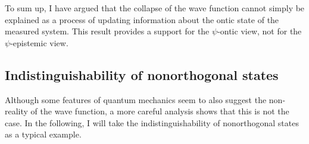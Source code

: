 To sum up, I have argued that the collapse of the wave function cannot simply be explained as a process of updating information about the ontic state of the measured system. This result provides a support for the $\psi$-ontic view, not for the $\psi$-epistemic view.






\subsection{Indistinguishability of nonorthogonal states}

Although some features of quantum mechanics seem to also suggest the non-reality of the wave function, a more careful analysis shows that this is not the case. In the following, I will take the indistinguishability of nonorthogonal states as a typical example.

